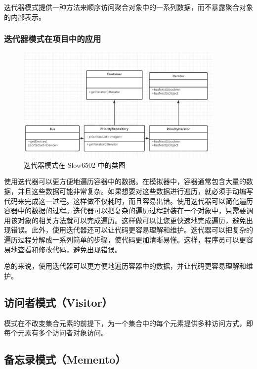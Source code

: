 \documentclass[cn,black,12pt,normal]{elegantnote}
\begin{document}
迭代器模式提供一种方法来顺序访问聚合对象中的一系列数据，而不暴露聚合对象的内部表示。

\subsubsection{迭代器模式在项目中的应用}

\begin{figure}[H]
  \centering
  \includegraphics[width=0.9\textwidth]{figures/迭代器模式.pdf}
  \caption{迭代器模式在 Slow6502 中的类图}
\end{figure}

使用迭代器可以更方便地遍历容器中的数据。在模拟器中，容器通常包含大量的数据，并且这些数据可能非常复杂。如果想要对这些数据进行遍历，就必须手动编写代码来完成这一过程。这样做不仅耗时，而且容易出错。使用迭代器可以简化遍历容器中的数据的过程。迭代器可以把复杂的遍历过程封装在一个对象中，只需要调用该对象的相关方法就可以完成遍历。这样做可以让您更快速地完成遍历，避免出现错误。此外，使用迭代器还可以让代码更容易理解和维护。迭代器可以把复杂的遍历过程分解成一系列简单的步骤，使代码更加清晰易懂。这样，程序员可以更容易地查看和修改代码，避免出现错误。

总的来说，使用迭代器可以更方便地遍历容器中的数据，并让代码更容易理解和维护。



\subsection{访问者模式（Visitor）}

模式在不改变集合元素的前提下，为一个集合中的每个元素提供多种访问方式，即每个元素有多个访问者对象访问。


\subsection{备忘录模式（Memento）}
\end{document}
